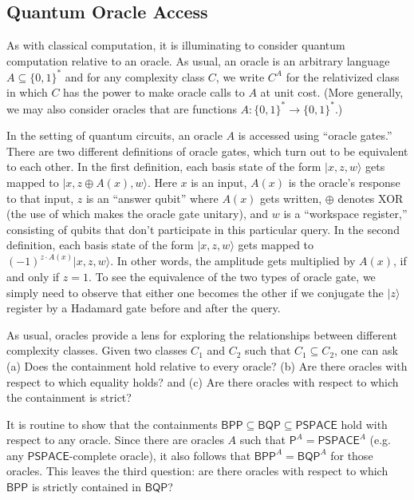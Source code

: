 \documentclass[11pt]{report}
\theoremstyle{plain}
\theoremstyle{definition}
\renewcommand{\ket}[1]{|#1\rangle}
\begin{document}
\subsection{Quantum Oracle Access}

As with classical computation, it is illuminating to consider quantum computation relative to an oracle.
As usual, an oracle is an arbitrary language $A \subseteq \{0,1\}^*$ and for any complexity class
$C$, we write $C^A$ for the relativized class in which $C$ has the power to make oracle
calls to $A$ at unit cost. (More generally, we may also consider oracles that are functions
$A:\{0,1\}^* \longrightarrow \{0,1\}^*$.)

In the setting of quantum circuits, an oracle $A$ is accessed using ``oracle gates.''
There are two different definitions of oracle gates, which turn out to be equivalent to each other.
In the first definition, each basis state of the form $\ket{x,z,w}$ gets mapped to $\ket{x,z\oplus A(x),w}$.
Here $x$ is an input, $A(x)$ is the oracle's response to that input, $z$ is an ``answer qubit'' where $A(x)$ gets
written, $\oplus$ denotes XOR (the use of which makes the oracle gate unitary), and $w$ is a ``workspace register,''
consisting of qubits that don't participate in this particular query.
In the second definition, each basis state of the form $\ket{x,z,w}$ gets mapped to $(-1)^{z\cdot A(x)} \ket{x,z,w}$.
In other words, the amplitude gets multiplied by $A(x)$, if and only if $z=1$.
To see the equivalence of the two types of oracle gate, we simply need to observe that either one becomes the other
if we conjugate the $\ket{z}$ register by a Hadamard gate before and after the query.

As usual, oracles provide a lens for exploring the relationships between different complexity classes.
Given two classes $C_1$ and $C_2$ such that $C_1 \subseteq C_2$, one can ask
(a) Does the containment hold relative to every oracle? (b) Are there
oracles with respect to which equality holds? and (c) Are there oracles with
respect to which the containment  is strict?

It is routine to show that the containments $\mathsf{BPP} \subseteq \mathsf{BQP} \subseteq \mathsf{PSPACE}$
hold with respect to any oracle.  Since there are oracles $A$ such that $\mathsf{P}^A=\mathsf{PSPACE}^A$
(e.g. any $\mathsf{PSPACE}$-complete oracle), it also follows that $\mathsf{BPP}^A=\mathsf{BQP}^A$ for those oracles.
This leaves the third question: are there oracles with respect to which $\mathsf{BPP}$ is
strictly contained in $\mathsf{BQP}$?
\end{document}

